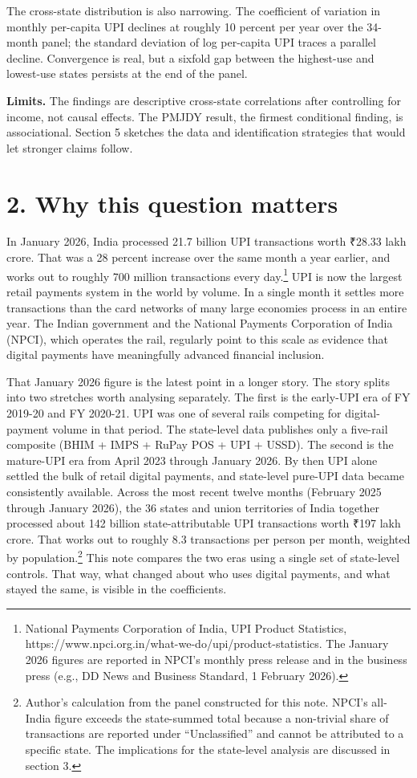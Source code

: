 \documentclass[
]{article}
\begin{document}
The cross-state distribution is also narrowing. The coefficient of
variation in monthly per-capita UPI declines at roughly 10 percent per
year over the 34-month panel; the standard deviation of log per-capita
UPI traces a parallel decline. Convergence is real, but a sixfold gap
between the highest-use and lowest-use states persists at the end of the
panel.

\textbf{Limits.} The findings are descriptive cross-state correlations
after controlling for income, not causal effects. The PMJDY result, the
firmest conditional finding, is associational. Section 5 sketches the
data and identification strategies that would let stronger claims
follow.

\section{2. Why this question matters}\label{why-this-question-matters}

In January 2026, India processed 21.7 billion UPI transactions worth
₹28.33 lakh crore. That was a 28 percent increase over the same month a
year earlier, and works out to roughly 700 million transactions every
day.\footnote{National Payments Corporation of India, UPI Product
  Statistics, https://www.npci.org.in/what-we-do/upi/product-statistics.
  The January 2026 figures are reported in NPCI's monthly press release
  and in the business press (e.g., DD News and Business Standard, 1
  February 2026).} UPI is now the largest retail payments system in the
world by volume. In a single month it settles more transactions than the
card networks of many large economies process in an entire year. The
Indian government and the National Payments Corporation of India (NPCI),
which operates the rail, regularly point to this scale as evidence that
digital payments have meaningfully advanced financial inclusion.

That January 2026 figure is the latest point in a longer story. The
story splits into two stretches worth analysing separately. The first is
the early-UPI era of FY 2019-20 and FY 2020-21. UPI was one of several
rails competing for digital-payment volume in that period. The
state-level data publishes only a five-rail composite (BHIM + IMPS +
RuPay POS + UPI + USSD). The second is the mature-UPI era from April
2023 through January 2026. By then UPI alone settled the bulk of retail
digital payments, and state-level pure-UPI data became consistently
available. Across the most recent twelve months (February 2025 through
January 2026), the 36 states and union territories of India together
processed about 142 billion state-attributable UPI transactions worth
₹197 lakh crore. That works out to roughly 8.3 transactions per person
per month, weighted by population.\footnote{Author's calculation from
  the panel constructed for this note. NPCI's all-India figure exceeds
  the state-summed total because a non-trivial share of transactions are
  reported under ``Unclassified'' and cannot be attributed to a specific
  state. The implications for the state-level analysis are discussed in
  section 3.} This note compares the two eras using a single set of
state-level controls. That way, what changed about who uses digital
payments, and what stayed the same, is visible in the coefficients.
\end{document}
